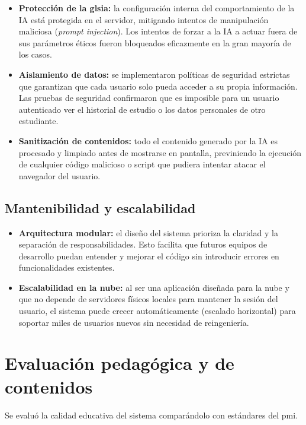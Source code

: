 \begin{itemize}
\item   \textbf{Protección de la gls{ia}:} la configuración interna del comportamiento de la IA está protegida en el servidor, mitigando intentos de manipulación maliciosa (\textit{prompt injection}). Los intentos de forzar a la IA a actuar fuera de sus parámetros éticos fueron bloqueados eficazmente en la gran mayoría de los casos.
\item   \textbf{Aislamiento de datos:} se implementaron políticas de seguridad estrictas que garantizan que cada usuario solo pueda acceder a su propia información. Las pruebas de seguridad confirmaron que es imposible para un usuario autenticado ver el historial de estudio o los datos personales de otro estudiante.
\item   \textbf{Sanitización de contenidos:} todo el contenido generado por la IA es procesado y limpiado antes de mostrarse en pantalla, previniendo la ejecución de cualquier código malicioso o script que pudiera intentar atacar el navegador del usuario.
\end{itemize}

\subsection{Mantenibilidad y escalabilidad}
\begin{itemize}
\item   \textbf{Arquitectura modular:} el diseño del sistema prioriza la claridad y la separación de responsabilidades. Esto facilita que futuros equipos de desarrollo puedan entender y mejorar el código sin introducir errores en funcionalidades existentes.
\item   \textbf{Escalabilidad en la nube:} al ser una aplicación diseñada para la nube y que no depende de servidores físicos locales para mantener la sesión del usuario, el sistema puede crecer automáticamente (escalado horizontal) para soportar miles de usuarios nuevos sin necesidad de reingeniería.
\end{itemize}

\section{Evaluación pedagógica y de contenidos}

Se evaluó la calidad educativa del sistema comparándolo con estándares del \gls{pmi}.

